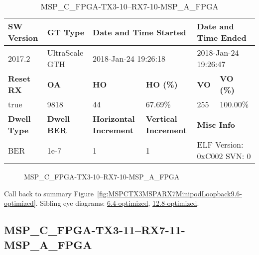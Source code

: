 \begin{table}[h]
\centering
\caption{MSP\_C\_FPGA-TX3-10--RX7-10-MSP\_A\_FPGA}
\label{tab:MSPCFPGATX310RX710MSPAFPGA9.6-optimized}
\begin{tabular}{@{}|l|l|l|l|l|l|@{}}
\toprule
\textbf{SW Version}                & \textbf{GT Type}   & \multicolumn{2}{l|}{\textbf{Date and Time Started}}            & \multicolumn{2}{l|}{\textbf{Date and Time Ended}}        \\ \midrule
2017.2                       & UltraScale GTH          & \multicolumn{2}{l|}{2018-Jan-24 19:26:18}                   & \multicolumn{2}{l|}{2018-Jan-24 19:26:47}               \\ \midrule
\textbf{Reset RX}                  & \textbf{OA} & \textbf{HO}   & \textbf{HO (\%)} & \textbf{VO} & \textbf{VO (\%)} \\ \midrule
true & 9818        & 44          & 67.69\%        & 255        & 100.00\%       \\ \midrule
\textbf{Dwell Type}                & \textbf{Dwell BER} & \textbf{Horizontal Increment} & \textbf{Vertical Increment}    & \multicolumn{2}{l|}{\textbf{Misc Info}}                  \\ \midrule
BER                            & 1e-7        & 1        & 1           & \multicolumn{2}{l|}{ELF Version: 0xC002 SVN: 0}                         \\ \bottomrule
\end{tabular}
\end{table}

\begin{figure}[h]
\caption{MSP\_C\_FPGA-TX3-10--RX7-10-MSP\_A\_FPGA} \label{fig:MSPCFPGATX310RX710MSPAFPGA9.6-optimized}
\end{figure}

Call back to summary Figure~\ref{fig:MSPCTX3MSPARX7MinipodLoopback9.6-optimized}.
Sibling eye diagrams: \hyperref[sec:MSPCFPGATX310RX710MSPAFPGA6.4-optimized]{6.4-optimized}, \hyperref[sec:MSPCFPGATX310RX710MSPAFPGA12.8-optimized]{12.8-optimized}.

\clearpage
\newpage


\subsection{MSP\_C\_FPGA-TX3-11--RX7-11-MSP\_A\_FPGA}\label{sec:MSPCFPGATX311RX711MSPAFPGA9.6-optimized}

